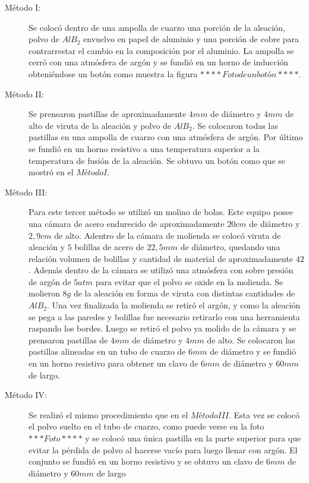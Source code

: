 \documentclass[a4paper,12pt,fleqn,twoside,openany]{book}
\begin{document}
\begin{description}
\item[Método I:] Se colocó dentro de una ampolla de cuarzo una porción de la aleación, polvo de $AlB_2$ envuelvo en papel de aluminio y una porción de 
cobre para contrarrestar el cambio en la composición por el aluminio. La ampolla se cerró con una atmósfera de argón y se fundió en un horno de inducción obteniéndose un botón como muestra la figura $****Foto de un botón****$.



\item[Método II:] Se prensaron pastillas de aproximadamente $4mm$ de diámetro y $4mm$ de alto de viruta de la aleación y polvo de $AlB_2$. Se 
colocaron todas las pastillas en una ampolla de cuarzo con una atmósfera de argón. Por último se fundió en un horno resistivo a una temperatura superior 
a la temperatura de fusión de la aleación. Se obtuvo un botón como que se mostró en el $Método I$.
\item[Método III:] Para este tercer método se utilizó un molino de bolas. Este equipo posee una cámara de acero endurecido de aproximadamente $20 cm$ de diámetro y $2,9 cm$ de alto. Adentro de la cámara de molienda se colocó viruta de aleación y $5$ bolillas de acero de $22,5 mm$ de diámetro, quedando una relación volumen de bolillas y cantidad de material de aproximadamente $42$. Además dentro de la cámara se utilizó una atmósfera con sobre presión de argón de 
$5 atm$ para evitar que el polvo se oxide en la molienda.
Se molieron $8g$ de la aleación en forma de viruta con distintas cantidades de $AlB_2$.  Una vez finalizada la molienda se retiró el argón, y 
como la aleación se pega a las paredes y bolillas fue necesario retirarlo con una herramienta raspando los bordes.
Luego se retiró el polvo ya molido de la cámara y se prensaron pastillas de $4mm$ de diámetro y $4mm$ de alto. Se colocaron las pastillas alineadas en un tubo de cuarzo de $6 mm$ de diámetro y se fundió en un horno resistivo para obtener un clavo de $6 mm$ de diámetro y $60 mm$ de largo.
\item[Método IV:] Se realizó el mismo procedimiento que en el $Método III$. Esta vez se colocó el polvo suelto en el tubo de cuarzo, como puede verse en la foto $***Foto****$ y se colocó una única pastilla en la parte superior para que evitar la pérdida de polvo al hacerse vacío para luego llenar con argón. El conjunto se fundió en un horno resistivo y se obtuvo un clavo de $6 mm$ de diámetro y $60 mm$ de largo 
\end{description}
\end{document}
